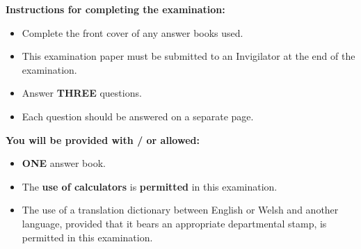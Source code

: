 \documentclass[12pt,a4paper,twoside]{article}
\begin{document}
\bigskip
{\bf Instructions for completing the examination:}

\begin{itemize}[itemsep=-3pt]
\item Complete the front cover of any answer books used.

\item This examination paper must be submitted to an Invigilator at the end of the examination. 

\item Answer {\bf THREE} questions.

\item Each question should be answered on a separate page.
\end{itemize}

\bigskip
{\bf You will be provided with / or allowed:}

\begin{itemize}[itemsep=-3pt]
\item {\bf ONE} answer book.

\item The {\bf use of calculators} is {\bf permitted} in this examination.

\item The use of a translation dictionary between English or Welsh and another language, provided that it bears an appropriate departmental stamp, is permitted in this examination.

\end{itemize}
\end{document}
